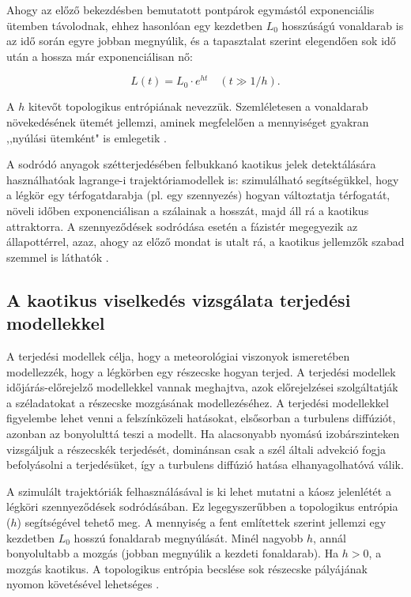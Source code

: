 \documentclass[12pt,a4paper]{article}
\begin{document}
Ahogy az előző bekezdésben bemutatott pontpárok egymástól exponenciális ütemben távolodnak, ehhez hasonlóan egy kezdetben $L_0$ hosszúságú vonaldarab is az idő során egyre jobban megnyúlik, és a tapasztalat szerint elegendően sok idő után a hossza már exponenciálisan nő:

\[
L(t)=L_0 \cdot e^{ht} \quad (t\gg 1/h).
\]

A $h$ kitevőt topologikus entrópiának nevezzük. Szemléletesen a vonaldarab növekedésének ütemét jellemzi, aminek megfelelően a mennyiséget gyakran ,,nyúlási ütemként" is emlegetik \cite{haszpra_ensemble-based_2019}.

A sodródó anyagok szétterjedésében felbukkanó kaotikus jelek detektálására használhatóak lagrange-i trajektóriamodellek is: szimulálható segítségükkel, hogy a légkör egy térfogatdarabja (pl. egy szennyezés) hogyan változtatja térfogatát, növeli időben exponenciálisan a szálainak a hosszát, majd áll rá a kaotikus attraktorra. A szennyeződések sodródása esetén a fázistér megegyezik az állapottérrel, azaz, ahogy az előző mondat is utalt rá, a kaotikus jellemzők szabad szemmel is láthatók \cite{haszpra_replat_2014}.

\subsection{A kaotikus viselkedés vizsgálata terjedési modellekkel}

A terjedési modellek célja, hogy a meteorológiai viszonyok ismeretében modellezzék, hogy a légkörben egy részecske hogyan terjed. A terjedési modellek időjárás-előrejelző modellekkel vannak meghajtva, azok előrejelzései szolgáltatják a széladatokat a részecske mozgásának modellezéséhez. A terjedési modellekkel figyelembe lehet venni a felszínközeli hatásokat, elsősorban a turbulens diffúziót, azonban az bonyolulttá teszi a modellt. Ha alacsonyabb nyomású izobárszinteken vizsgáljuk a részecskék terjedését, dominánsan csak a szél általi advekció fogja befolyásolni a terjedésüket, így a turbulens diffúzió hatása elhanyagolhatóvá válik. 

A szimulált trajektóriák felhasználásával is ki lehet mutatni a káosz jelenlétét a légköri szennyeződések sodródásában. Ez legegyszerűbben a topologikus entrópia ($h$) segítségével tehető meg. A mennyiség a fent említettek szerint jellemzi egy kezdetben $L_0$ hosszú fonaldarab megnyúlását. Minél nagyobb $h$, annál bonyolultabb a mozgás (jobban megnyúlik a kezdeti fonaldarab). Ha $h>0$, a mozgás kaotikus. A topologikus entrópia becslése sok részecske pályájának nyomon követésével lehetséges \cite{leelossy_szennyezoanyagok_2017, haszpra_replat_2014}.
\end{document}
